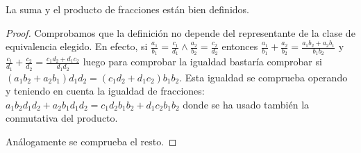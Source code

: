 \begin{proposition}
	La suma y el producto de fracciones están bien definidos.
\end{proposition}
\begin{proof}
	Comprobamos que la definición no depende del representante de la clase de equivalencia elegido. En efecto, si $\frac{a_1}{b_1} = \frac{c_1}{d_1} \land \frac{a_2}{b_2} = \frac{c_2}{d_2}$ entonces $\frac{a_1}{b_1}+\frac{a_2}{b_2} = \frac{a_1b_2+a_2b_1}{b_1b_2}$ y $\frac{c_1}{d_1} + \frac{c_2}{d_2} = \frac{c_1d_2+d_1c_2}{d_1d_2}$ luego para comprobar la igualdad bastaría comprobar si $(a_1b_2+a_2b_1)d_1d_2 = (c_1d_2+d_1c_2)b_1b_2$. Esta igualdad se comprueba operando y teniendo en cuenta la igualdad de fracciones: $a_1b_2d_1d_2 + a_2b_1d_1d_2 = c_1d_2b_1b_2 + d_1c_2b_1b_2$ donde se ha usado también la conmutativa del producto. 
	
	Análogamente se comprueba el resto. 
\end{proof}

